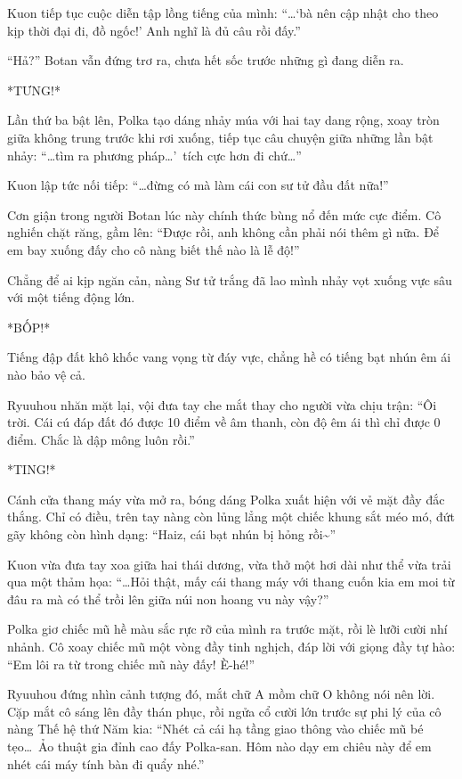 \documentclass[../main.tex]{subfiles}
\begin{document}
Kuon tiếp tục cuộc diễn tập lồng tiếng của mình: ``\dots `bà nên cập nhật cho theo kịp thời đại đi, đồ ngốc!'  Anh nghĩ là đủ câu rồi đấy.''

``Hả?'' Botan vẫn đứng trơ ra, chưa hết sốc trước những gì đang diễn ra.

*TƯNG!*

Lần thứ ba bật lên, Polka tạo dáng nhảy múa với hai tay dang rộng, xoay tròn giữa không trung trước khi rơi xuống, tiếp tục câu chuyện giữa những lần bật nhảy: ``\dots tìm ra phương pháp\dots'\ tích cực hơn đi chứ\dots''

Kuon lập tức nối tiếp: ``\dots đừng có mà làm cái con sư tử đầu đất nữa!''

Cơn giận trong người Botan lúc này chính thức bùng nổ đến mức cực điểm. Cô nghiến chặt răng, gầm lên: ``Được rồi, anh không cần phải nói thêm gì nữa. Để em bay xuống đấy cho cô nàng biết thế nào là lễ độ!''

Chẳng để ai kịp ngăn cản, nàng Sư tử trắng đã lao mình nhảy vọt xuống vực sâu với một tiếng động lớn.

*BỐP!*

Tiếng đập đất khô khốc vang vọng từ đáy vực, chẳng hề có tiếng bạt nhún êm ái nào bảo vệ cả.

Ryuuhou nhăn mặt lại, vội đưa tay che mắt thay cho người vừa chịu trận: ``Ôi trời. Cái cú đáp đất đó được 10 điểm về âm thanh, còn độ êm ái thì chỉ được 0 điểm. Chắc là dập mông luôn rồi.''

*TING!*

Cánh cửa thang máy vừa mở ra, bóng dáng Polka xuất hiện với vẻ mặt đầy đắc thắng. Chỉ có điều, trên tay nàng còn lủng lẳng một chiếc khung sắt méo mó, đứt gãy không còn hình dạng: ``Haiz, cái bạt nhún bị hỏng rồi\~{}''

Kuon vừa đưa tay xoa giữa hai thái dương, vừa thở một hơi dài như thể vừa trải qua một thảm họa: ``\dots Hỏi thật, mấy cái thang máy với thang cuốn kia em moi từ đâu ra mà có thể trồi lên giữa núi non hoang vu này vậy?''

Polka giơ chiếc mũ hề màu sắc rực rỡ của mình ra trước mặt, rồi lè lưỡi cười nhí nhảnh. Cô xoay chiếc mũ một vòng đầy tinh nghịch, đáp lời với giọng đầy tự hào: ``Em lôi ra từ trong chiếc mũ này đấy! È-hé!''

Ryuuhou đứng nhìn cảnh tượng đó, mắt chữ A mồm chữ O không nói nên lời. Cặp mắt cô sáng lên đầy thán phục, rồi ngửa cổ cười lớn trước sự phi lý của cô nàng Thế hệ thứ Năm kia: ``Nhét cả cái hạ tầng giao thông vào chiếc mũ bé tẹo\dots\ Ảo thuật gia đỉnh cao đấy Polka-san. Hôm nào dạy em chiêu này để em nhét cái máy tính bàn đi quẩy nhé.''
\end{document}
